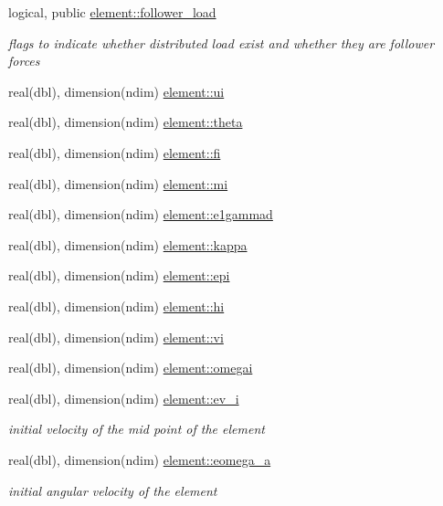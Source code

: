 \begin{DoxyCompactItemize}
logical, public \hyperlink{namespaceelement_a2babdd1ffcf39971fb9b118d88d1e223}{element\+::follower\+\_\+load}
\begin{DoxyCompactList}\small\item\em flags to indicate whether distributed load exist and whether they are follower forces \end{DoxyCompactList}\item 
real(dbl), dimension(ndim) \hyperlink{namespaceelement_ad1b3c2d05a1c131831f0d4eef43f9105}{element\+::ui}
\item 
real(dbl), dimension(ndim) \hyperlink{namespaceelement_ac0a8fcda10d1b0af47fd7d713ebcd5fe}{element\+::theta}
\item 
real(dbl), dimension(ndim) \hyperlink{namespaceelement_aa97de262111f37b6e4b721cad221946a}{element\+::fi}
\item 
real(dbl), dimension(ndim) \hyperlink{namespaceelement_aaa8af943c974b60b3eeacd9ea685f28b}{element\+::mi}
\item 
real(dbl), dimension(ndim) \hyperlink{namespaceelement_aa1c0af00208b47c11ed5b1dc17fb33b3}{element\+::e1gammad}
\item 
real(dbl), dimension(ndim) \hyperlink{namespaceelement_ad5ea7346491c313bb4094d1838fe747e}{element\+::kappa}
\item 
real(dbl), dimension(ndim) \hyperlink{namespaceelement_afd7049cf1988fff1d20ea9fae6290b27}{element\+::epi}
\item 
real(dbl), dimension(ndim) \hyperlink{namespaceelement_aec782f88829f63bff819c43e9c19f02c}{element\+::hi}
\item 
real(dbl), dimension(ndim) \hyperlink{namespaceelement_a7e7198874f6dd0702abdd8ba0dfc7c2d}{element\+::vi}
\item 
real(dbl), dimension(ndim) \hyperlink{namespaceelement_ad819facefa1f1184a10576007ac79ba4}{element\+::omegai}
\item 
real(dbl), dimension(ndim) \hyperlink{namespaceelement_a38ecc4368e8e51d5672ad47f1a79536e}{element\+::ev\+\_\+i}
\begin{DoxyCompactList}\small\item\em initial velocity of the mid point of the element \end{DoxyCompactList}\item 
real(dbl), dimension(ndim) \hyperlink{namespaceelement_a8d354f7c393ef7f0ba4144a20b5390ba}{element\+::eomega\+\_\+a}
\begin{DoxyCompactList}\small\item\em initial angular velocity of the element \end{DoxyCompactList}\item 

\end{DoxyCompactItemize}
